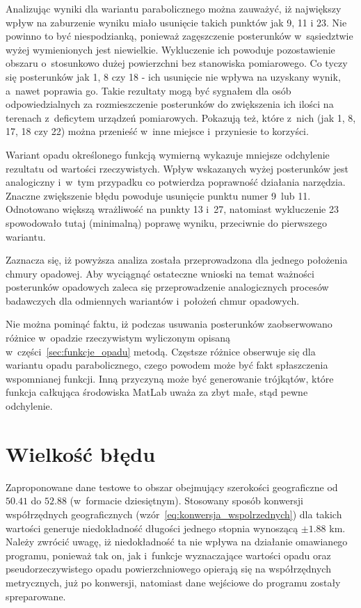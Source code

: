 Analizując wyniki dla wariantu parabolicznego można zauważyć, iż największy wpływ na zaburzenie wyniku miało usunięcie takich punktów jak 9, 11 i 23. Nie powinno to być niespodzianką, ponieważ zagęszczenie posterunków w~sąsiedztwie wyżej wymienionych jest niewielkie. Wykluczenie ich powoduje pozostawienie obszaru o~stosunkowo dużej powierzchni bez stanowiska pomiarowego. Co tyczy się posterunków jak 1, 8 czy 18 - ich usunięcie nie wpływa na uzyskany wynik, a~nawet poprawia go. Takie rezultaty mogą być sygnałem dla osób odpowiedzialnych za rozmieszczenie posterunków do zwiększenia ich ilości na terenach z~deficytem urządzeń pomiarowych. Pokazują też, które z~nich (jak 1, 8, 17, 18 czy 22) można przenieść w~inne miejsce i~przyniesie to korzyści.


Wariant opadu określonego funkcją wymierną wykazuje mniejsze odchylenie rezultatu od wartości rzeczywistych. Wpływ wskazanych wyżej posterunków jest analogiczny i~w~tym przypadku co potwierdza poprawność działania narzędzia. Znaczne zwiększenie błędu powoduje usunięcie punktu numer 9~lub 11. Odnotowano większą wrażliwość na punkty 13 i~27, natomiast wykluczenie 23 spowodowało tutaj (minimalną) poprawę wyniku, przeciwnie do pierwszego wariantu.

Zaznacza się, iż powyższa analiza została przeprowadzona dla jednego położenia chmury opadowej. Aby wyciągnąć ostateczne wnioski na temat ważności posterunków opadowych zaleca się przeprowadzenie analogicznych procesów badawczych dla odmiennych wariantów i~położeń chmur opadowych.

Nie można pominąć faktu, iż podczas usuwania posterunków zaobserwowano różnice w~opadzie rzeczywistym wyliczonym opisaną w~części~\ref{sec:funkcje_opadu} metodą. Częstsze różnice obserwuje się dla wariantu opadu parabolicznego, czego powodem może być fakt spłaszczenia wspomnianej funkcji. Inną przyczyną może być generowanie trójkątów, które funkcja całkująca środowiska MatLab uważa za zbyt małe, stąd pewne odchylenie.

\section{Wielkość błędu}
Zaproponowane dane testowe to obszar obejmujący szerokości geograficzne od $50.41$ do $52.88$ (w~formacie dziesiętnym). Stosowany sposób konwersji współrzędnych geograficznych (wzór~\ref{eq:konwersja_wspolrzednych}) dla takich wartości generuje niedokładność długości jednego stopnia wynoszącą $\pm 1.88$ km. Należy zwrócić uwagę, iż niedokładność ta nie wpływa na działanie omawianego programu, ponieważ tak on, jak i~funkcje wyznaczające wartości opadu oraz pseudorzeczywistego opadu powierzchniowego opierają się na współrzędnych metrycznych, już po konwersji, natomiast dane wejściowe do programu zostały spreparowane.  

